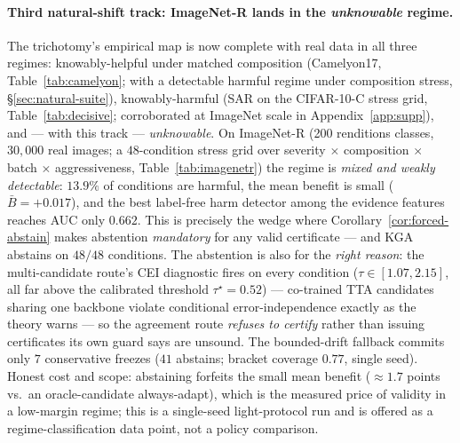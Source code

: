 \documentclass[conference]{IEEEtran}
\theoremstyle{plain}
\theoremstyle{definition}
\begin{document}
\paragraph{Third natural-shift track: ImageNet-R lands in the \emph{unknowable} regime.}
The trichotomy's empirical map is now complete with real data in all three regimes:
knowably-helpful under matched composition (Camelyon17, Table~\ref{tab:camelyon}; with a detectable
harmful regime under composition stress, \S\ref{sec:natural-suite}), knowably-harmful (SAR on the
CIFAR-10-C stress grid, Table~\ref{tab:decisive}; corroborated at ImageNet scale in
Appendix~\ref{app:supp}), and --- with this track --- \emph{unknowable}.
On ImageNet-R (200 renditions classes, $30{,}000$ real images; a $48$-condition stress
grid over severity $\times$ composition $\times$ batch $\times$ aggressiveness,
Table~\ref{tab:imagenetr}) the regime is \emph{mixed and weakly detectable}: $13.9\%$ of
conditions are harmful, the mean benefit is small ($\bar B={+}0.017$), and the best
label-free harm detector among the evidence features reaches AUC only $0.662$. This is
precisely the wedge where Corollary~\ref{cor:forced-abstain} makes abstention
\emph{mandatory} for any valid certificate --- and \textsc{KGA} abstains on $48/48$
conditions. The abstention is also for the \emph{right reason}: the multi-candidate
route's CEI diagnostic fires on every condition ($\tau\in[1.07,2.15]$, all far above the
calibrated threshold $\tau^\star{=}0.52$) --- co-trained TTA candidates sharing one
backbone violate conditional error-independence exactly as the theory warns --- so the
agreement route \emph{refuses to certify} rather than issuing certificates its own guard
says are unsound. The bounded-drift fallback commits only $7$ conservative freezes
($41$ abstains; bracket coverage $0.77$, single seed). Honest cost and scope: abstaining
forfeits the small mean benefit ($\approx\!1.7$ points vs.\ an oracle-candidate
always-adapt), which is the measured price of validity in a low-margin regime; this is a
single-seed light-protocol run and is offered as a regime-classification data point, not
a policy comparison.
\end{document}
